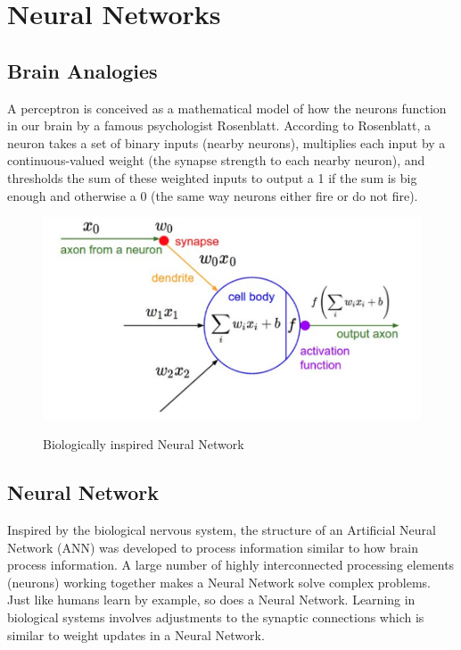 \pagebreak

\section{Neural Networks}
\subsection{Brain Analogies}

A perceptron is conceived as a mathematical model of how the neurons function in our brain by a famous psychologist Rosenblatt. According to Rosenblatt, a neuron  takes a set of binary inputs (nearby neurons), multiplies each input by a continuous-valued weight (the synapse strength to each nearby neuron), and thresholds the sum of these weighted inputs to output a 1 if the sum is big enough and otherwise a 0 (the same way neurons either fire or do not fire).

\begin{figure}[H]
\begin{center}
\includegraphics[height=.28\textheight]{Chapter2/Figs/NeuralNetwork.png}
\label{fig:Neural_Network}
\caption{Biologically inspired Neural Network \cite{karparthy}}
\end{center}
\end{figure}

\subsection{Neural Network}

Inspired by the biological nervous system, the structure of an Artificial Neural Network (ANN) was developed to process information similar to how brain process information. A large number of highly interconnected processing elements (neurons) working together makes a Neural Network solve complex problems. Just like humans learn by example, so does a Neural Network. Learning in biological systems involves adjustments to the synaptic connections which is similar to weight updates in a Neural Network. 


